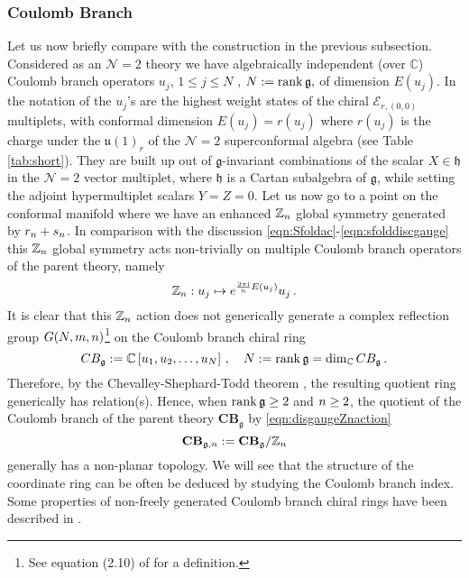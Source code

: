 \documentclass[main.tex]{subfiles}
\begin{document}
\subsubsection{Coulomb Branch}
Let us now briefly compare with the construction in the previous subsection. Considered as an $\mathcal{N}=2$ theory we have algebraically independent (over $\mathbb{C}$) Coulomb branch operators $u_j$, $1\leq j\leq N$ , $N:=\operatorname{rank}\mathfrak{g},$ of dimension $E(u_j)$. In the notation of \cite{DolanOsborn} the $u_j$'s are the highest weight states of the chiral $\mathcal{E}_{r,(0,0)}$ multiplets, with conformal dimension $E(u_j)=r(u_j)$ where $r(u_j)$ is the charge under the $\mathfrak{u}(1)_r$ of the $\mathcal{N}=2$ superconformal algebra (see Table \ref{tab:short}). They are built up out of $\mathfrak{g}$-invariant combinations of the scalar $X\in\mathfrak{h}$ in the $\mathcal{N}=2$ vector multiplet, where $\mathfrak{h}$ is a Cartan subalgebra of $\mathfrak{g}$, while setting the adjoint hypermultiplet scalars $Y=Z=0$. Let us now go to a point on the conformal manifold where we have an enhanced $\mathbb{Z}_{n}$ global symmetry generated by $r_{n}+ s_{n}$. In comparison with the discussion \eqref{eqn:Sfoldac}-\eqref{eqn:sfolddiscgauge} this $\mathbb{Z}_{n}$ global symmetry acts non-trivially on multiple Coulomb branch operators of the parent theory, namely
\begin{equation}\label{eqn:disgaugeZnaction}
\mathbb{Z}_{n}: u_j\mapsto e^{\frac{2\pi\mathrm{i}}{n} E(u_j)}u_j\,.
\end{equation}
It is clear that this $\mathbb{Z}_{n}$ action does not generically generate a complex reflection group $G(N,m,n)$\footnote{See equation (2.10) of \cite{Aharony:2016kai} for a definition.} on the Coulomb branch chiral ring 
\begin{equation}
CB_{\mathfrak{g}}:=\mathbb{C}\left[u_1,u_2,\dots,u_{N}\right]\,,\quad N:=\operatorname{rank}\mathfrak{g}=\dim_{\mathbb{C}}CB_{\mathfrak{g}}\,.
\end{equation}
Therefore, by the Chevalley-Shephard-Todd theorem \cite{shephard1954finite,Aharony:2016kai}, the resulting quotient ring generically has relation(s). Hence, when $\operatorname{rank}\mathfrak{g}\geq2$ and $n\geq2$, the quotient of the Coulomb branch of the parent theory $\mathbf{CB}_{\mathfrak{g}}$ by \eqref{eqn:disgaugeZnaction}
\begin{equation}\label{eqn:CBquotient}
\mathbf{CB}_{\mathfrak{g},n}:=\mathbf{CB}_{\mathfrak{g}}/\mathbb{Z}_{n}
\end{equation}
generally has a non-planar topology. We will see that the structure of the coordinate ring can be often be deduced by studying the Coulomb branch index. Some properties of non-freely generated Coulomb branch chiral rings have been described in \cite{Argyres:2017tmj}.
\end{document}
